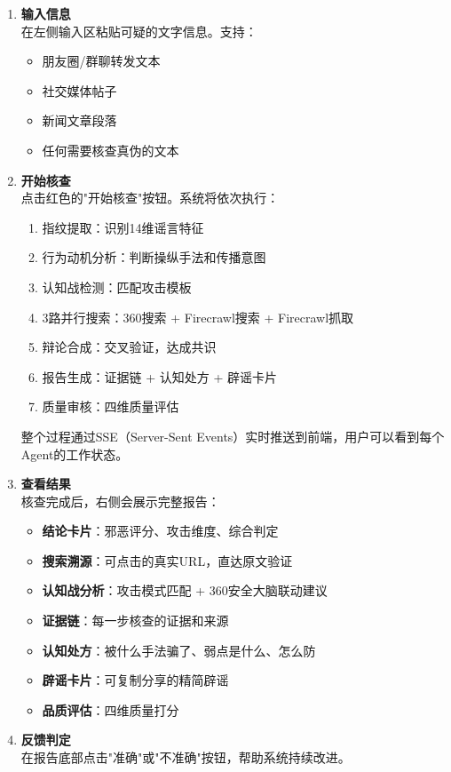 \documentclass[12pt,a4paper]{ctexart}
\begin{document}
\begin{enumerate}[leftmargin=*]

\item \textbf{输入信息}\\
在左侧输入区粘贴可疑的文字信息。支持：
\begin{itemize}
    \item 朋友圈/群聊转发文本
    \item 社交媒体帖子
    \item 新闻文章段落
    \item 任何需要核查真伪的文本
\end{itemize}

\item \textbf{开始核查}\\
点击红色的"开始核查"按钮。系统将依次执行：
\begin{enumerate}
    \item 指纹提取：识别14维谣言特征
    \item 行为动机分析：判断操纵手法和传播意图
    \item 认知战检测：匹配攻击模板
    \item 3路并行搜索：360搜索 + Firecrawl搜索 + Firecrawl抓取
    \item 辩论合成：交叉验证，达成共识
    \item 报告生成：证据链 + 认知处方 + 辟谣卡片
    \item 质量审核：四维质量评估
\end{enumerate}

整个过程通过SSE（Server-Sent Events）实时推送到前端，用户可以看到每个Agent的工作状态。

\item \textbf{查看结果}\\
核查完成后，右侧会展示完整报告：
\begin{itemize}
    \item \textbf{结论卡片}：邪恶评分、攻击维度、综合判定
    \item \textbf{搜索溯源}：可点击的真实URL，直达原文验证
    \item \textbf{认知战分析}：攻击模式匹配 + 360安全大脑联动建议
    \item \textbf{证据链}：每一步核查的证据和来源
    \item \textbf{认知处方}：被什么手法骗了、弱点是什么、怎么防
    \item \textbf{辟谣卡片}：可复制分享的精简辟谣
    \item \textbf{品质评估}：四维质量打分
\end{itemize}

\item \textbf{反馈判定}\\
在报告底部点击"准确"或"不准确"按钮，帮助系统持续改进。

\end{enumerate}
\end{document}
